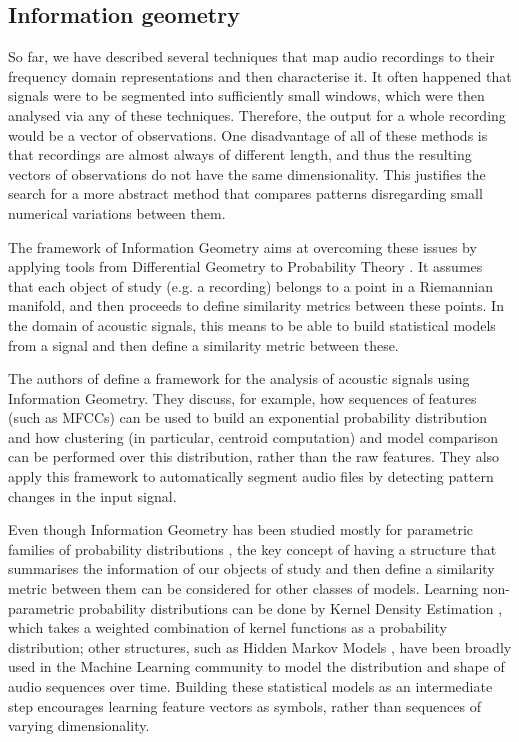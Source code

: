 \documentclass[../main.tex]{subfiles} \label{chapter_soa}
\begin{document}
\subsection{Information geometry} \label{subsection_infgeom}
So far, we have described several techniques that map audio recordings to their frequency domain representations and then characterise it. It often happened that signals were to be segmented into sufficiently small windows, which were then analysed via any of these techniques. Therefore, the output for a whole recording would be a vector of observations. One disadvantage of all of these methods is that recordings are almost always of different length, and thus the resulting vectors of observations do not have the same dimensionality. This justifies the search for a more abstract method that compares patterns disregarding small numerical variations between them. 
\par The framework of Information Geometry aims at overcoming these issues by applying tools from Differential Geometry to Probability Theory \cite{Wang2009}. It assumes that each object of study (e.g. a recording) belongs to a point in a Riemannian manifold, and then proceeds to define similarity metrics between these points. In the domain of acoustic signals, this means to be able to build statistical models from a signal and then define a similarity metric between these.
\par The authors of \cite{Cont2011} define a framework for the analysis of acoustic signals using Information Geometry. They discuss, for example, how sequences of features (such as MFCCs) can be used to build an exponential probability distribution and how clustering (in particular, centroid computation) and model comparison can be performed over this distribution, rather than the raw features. They also apply this framework to automatically segment audio files by detecting pattern changes in the input signal.
\par Even though Information Geometry has been studied mostly for parametric families of probability distributions \cite{Amari2001}, the key concept of having a structure that summarises the information of our objects of study and then define a similarity metric between them can be considered for other classes of models. Learning non-parametric probability distributions can be done by Kernel Density Estimation \cite{Goodall2008}, which takes a weighted combination of kernel functions as a probability distribution; other structures, such as Hidden Markov Models \cite{Chou2008,Muda2010,Hsieh2009,Wielgat2012}, have been broadly used in the Machine Learning community to model the distribution and shape of audio sequences over time. Building these statistical models as an intermediate step encourages learning feature vectors as symbols, rather than sequences of varying dimensionality.
\end{document}
